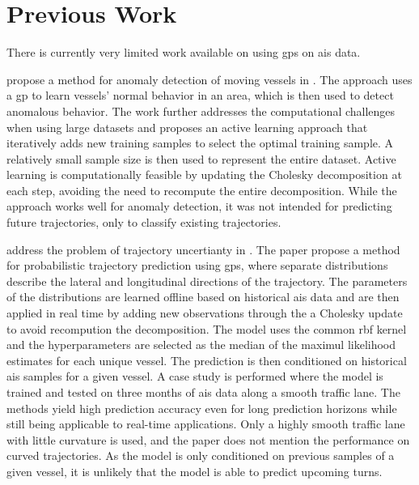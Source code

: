 \chapter{Previous Work}

There is currently very limited work available on using \acrshort{gp}s on \acrshort{ais} data.

\citeauthor{gpanomaly} propose a method for anomaly detection of moving vessels in \cite{gpanomaly}. The approach uses a \acrshort{gp} to learn vessels' normal behavior in an area, which is then used to detect anomalous behavior. The work further addresses the computational challenges when using large datasets and proposes an active learning approach that iteratively adds new training samples to select the optimal training sample. A relatively small sample size is then used to represent the entire dataset. Active learning is computationally feasible by updating the Cholesky decomposition at each step, avoiding the need to recompute the entire decomposition. While the approach works well for anomaly detection, it was not intended for predicting future trajectories, only to classify existing trajectories.

\citeauthor{gp_ais_trajectory} address the problem of trajectory uncertianty in \cite{gp_ais_trajectory}. The paper propose a method for probabilistic trajectory prediction using \acrshort{gp}s, where separate distributions describe the lateral and longitudinal directions of the trajectory. The parameters of the distributions are learned offline based on historical \acrshort{ais} data and are then applied in real time by adding new observations through the a Cholesky update to avoid recompution the decomposition. The model uses the common \acrshort{rbf} kernel and the hyperparameters are selected as the median of the maximul likelihood estimates for each unique vessel. The prediction is then conditioned on historical \acrshort{ais} samples for a given vessel.
A case study is performed where the model is trained and tested on three months of \acrshort{ais} data along a smooth traffic lane. The methods yield high prediction accuracy even for long prediction horizons while still being applicable to real-time applications. Only a highly smooth traffic lane with little curvature is used, and the paper does not mention the performance on curved trajectories. As the model is only conditioned on previous samples of a given vessel, it is unlikely that the model is able to predict upcoming turns. 

